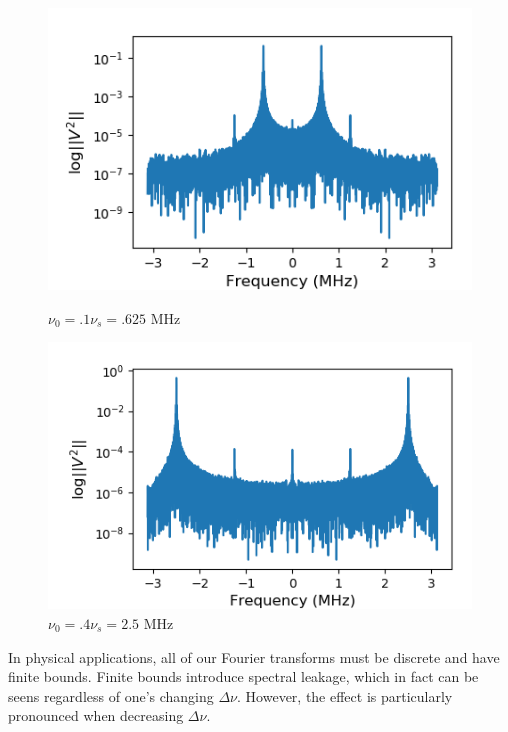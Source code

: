\documentclass[a4paper]{article}
\begin{document}
\begin{figure}
\centering
\begin{minipage}{.5\textwidth}
	\centering
	\includegraphics[width=\linewidth]{5-4/t1_eighth}
	\caption{$\nu_0 = .1 \nu_s = .625$ MHz}
	\label{fig:tenth_leakage}
\end{minipage}%
\begin{minipage}{.5\textwidth}
	\centering
	\includegraphics[width=\linewidth]{5-4/t4_eighth}
	\caption{$\nu_0 = .4 \nu_s = 2.5$ MHz}
	\label{fig:4tenths_leakage}
\end{minipage}
\end{figure}


In physical applications, all of our Fourier transforms must be discrete and have finite bounds. Finite bounds introduce spectral leakage, which in fact can be seens regardless of one's changing $\Delta \nu$. However, the effect is particularly pronounced when decreasing $\Delta \nu$. 
\end{document}
